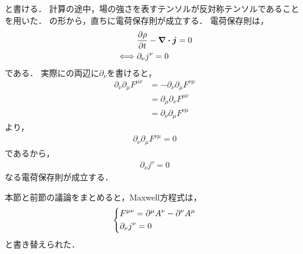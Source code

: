 \documentclass{report}
\begin{document}
    と書ける．
    計算の途中，場の強さを表すテンソルが反対称テンソルであることを用いた．
    の形から，直ちに電荷保存則が成立する．
    電荷保存則は，
    \begin{align}
      &\pdv{\rho}{t} - \div\bm{j} = 0 \\ 
      \iff& \partial_{\nu}j^{\nu} = 0
    \end{align}
    である．
    実際にの両辺に$\partial_{\nu}$を書けると，
    \begin{align}
      \partial_{\nu}\partial_{\mu}F^{\mu\nu} &= -\partial_{\nu}\partial_{\mu}F^{\nu\mu} \\ 
      &= \partial_{\mu}\partial_{\nu}F^{\mu\nu} \\ 
      &= \partial_{\nu}\partial_{\mu}F^{\nu\mu}
    \end{align}
    より，
    \begin{align}
      \partial_{\nu}\partial_{\mu}F^{\nu\mu} = 0
    \end{align}
    であるから，
    \begin{align}
      \partial_{\nu}j^{\nu} = 0
    \end{align}
    なる電荷保存則が成立する．
    \par
    本節と前節の議論をまとめると，Maxwell方程式は，
    \begin{align}
      \begin{dcases}
        F^{\mu\nu} = \partial^{\mu}A^{\nu} - \partial^{\nu}A^{\mu} \\ \label{maxwell-tensor}
        \partial_{\nu}j^{\nu} = 0 \\ 
      \end{dcases}
    \end{align}
    と書き替えられた．
\end{document}
